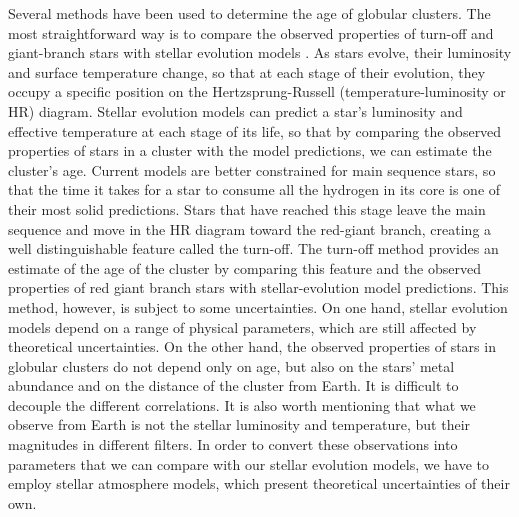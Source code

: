 \documentclass[useAMS,usenatbib]{mnras}
\begin{document}
Several methods have been used to determine the age of globular clusters. The most straightforward way is to compare the observed properties of turn-off and giant-branch stars with stellar evolution models \citep{2005AJ....130..116D,1999AJ....118.2306R,2011ApJ...738...74D}. As stars evolve, their luminosity and surface temperature change, so that at each stage of their evolution, they occupy a specific position on the Hertzsprung-Russell (temperature-luminosity or HR) diagram. Stellar evolution models can predict a star's luminosity and effective temperature at each stage of its life, so that by comparing the observed properties of stars in a cluster with the model predictions, we can estimate the cluster's age. Current models are better constrained for main sequence stars, so that the time it takes for a star to consume all the hydrogen in its core is one of their most solid predictions. Stars that have reached this stage leave the main sequence and move in the HR diagram toward the red-giant branch, creating a well distinguishable feature called the turn-off.  The turn-off method provides an estimate of the age of the cluster by comparing this feature and the observed properties of red giant branch stars with stellar-evolution model predictions. This method, however, is subject to some uncertainties. On one hand, stellar evolution models depend on a range of physical parameters, which are still affected by theoretical uncertainties. On the other hand, the observed properties of stars in globular clusters do not depend only on age, but also on the stars' metal abundance and on the distance of the cluster from Earth.  It is difficult to decouple the different correlations. It is also worth mentioning that what we observe from Earth is not the stellar luminosity and temperature, but their magnitudes in different filters. In order to convert these observations into parameters that we can compare with our stellar evolution models, we have to employ stellar atmosphere models, which present theoretical uncertainties of their own. 
\end{document}
